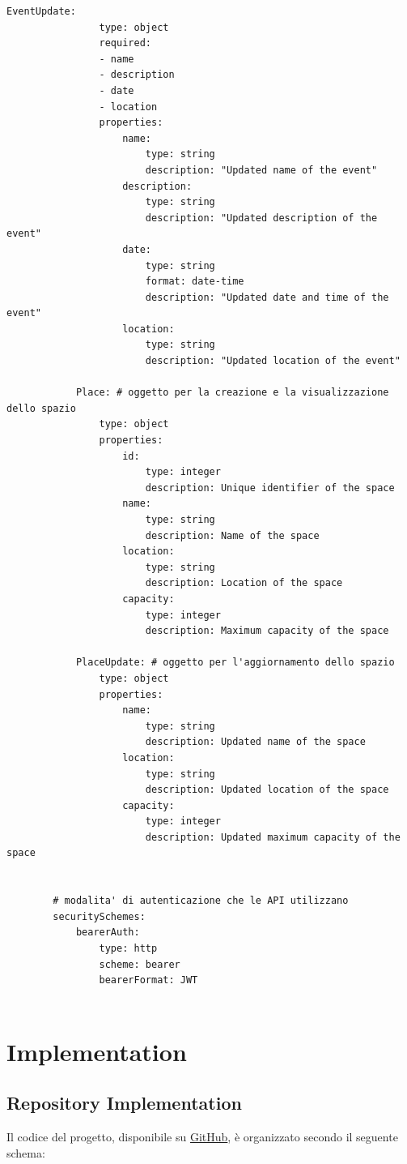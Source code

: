 \documentclass[9pt]{extarticle}
\begin{document}
\begin{lstlisting}[style=yamlcode, caption={Documentazione API}]
			EventUpdate:
				type: object
				required:
				- name
				- description
				- date
				- location
				properties:
					name:
						type: string
						description: "Updated name of the event"
					description:
						type: string
						description: "Updated description of the event"
					date:
						type: string
						format: date-time
						description: "Updated date and time of the event"
					location:
						type: string
						description: "Updated location of the event"
						
			Place: # oggetto per la creazione e la visualizzazione dello spazio
				type: object
				properties:
					id:
						type: integer
						description: Unique identifier of the space
					name:
						type: string
						description: Name of the space
					location:
						type: string
						description: Location of the space
					capacity:
						type: integer
						description: Maximum capacity of the space

   		    PlaceUpdate: # oggetto per l'aggiornamento dello spazio
				type: object
				properties:
					name:
						type: string
						description: Updated name of the space
					location:
						type: string
						description: Updated location of the space
					capacity:
						type: integer
						description: Updated maximum capacity of the space
	
			
		# modalita' di autenticazione che le API utilizzano
		securitySchemes:
			bearerAuth:
				type: http
				scheme: bearer
				bearerFormat: JWT
				
\end{lstlisting}
	

\newpage

\section{Implementation}
\subsection{Repository Implementation}

Il codice del progetto, disponibile su \href{https://github.com/rtogni00/IS_Progetto}{GitHub}, è organizzato secondo il seguente schema:
\end{document}
